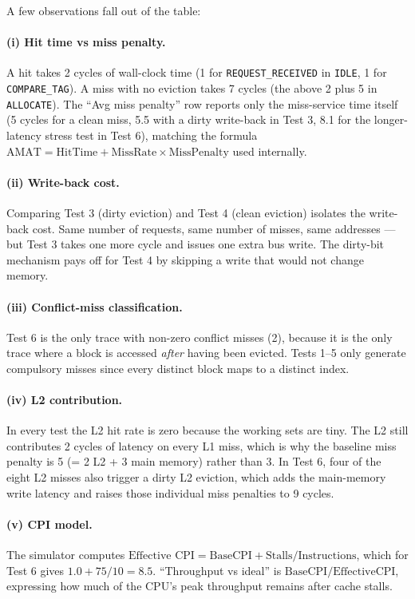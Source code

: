 \documentclass[11pt,a4paper]{article}
\begin{document}
A few observations fall out of the table:

\paragraph{(i) Hit time vs miss penalty.} A hit takes 2 cycles of wall-clock
time (1 for \texttt{REQUEST\_RECEIVED} in \texttt{IDLE}, 1 for
\texttt{COMPARE\_TAG}). A miss with no eviction takes 7 cycles (the above 2
plus 5 in \texttt{ALLOCATE}). The ``Avg miss penalty'' row reports only the
miss-service time itself (5 cycles for a clean miss, 5.5 with a dirty
write-back in Test 3, 8.1 for the longer-latency stress test in Test 6),
matching the formula
$\text{AMAT} = \text{HitTime} + \text{MissRate} \times \text{MissPenalty}$
used internally.

\paragraph{(ii) Write-back cost.} Comparing Test 3 (dirty eviction) and Test
4 (clean eviction) isolates the write-back cost. Same number of requests,
same number of misses, same addresses — but Test 3 takes one more cycle and
issues one extra bus write. The dirty-bit mechanism pays off for Test 4 by
skipping a write that would not change memory.

\paragraph{(iii) Conflict-miss classification.} Test 6 is the only trace with
non-zero conflict misses (2), because it is the only trace where a block is
accessed \emph{after} having been evicted. Tests 1–5 only generate
compulsory misses since every distinct block maps to a distinct index.

\paragraph{(iv) L2 contribution.} In every test the L2 hit rate is zero
because the working sets are tiny. The L2 still contributes 2 cycles of
latency on every L1 miss, which is why the baseline miss penalty is 5
(= 2 L2 + 3 main memory) rather than 3. In Test 6, four of the eight L2
misses also trigger a dirty L2 eviction, which adds the main-memory write
latency and raises those individual miss penalties to 9 cycles.

\paragraph{(v) CPI model.} The simulator computes
$\text{Effective CPI} = \text{BaseCPI} + \text{Stalls}/\text{Instructions}$,
which for Test 6 gives $1.0 + 75/10 = 8.5$. ``Throughput vs ideal'' is
$\text{BaseCPI}/\text{EffectiveCPI}$, expressing how much of the CPU's peak
throughput remains after cache stalls.
\end{document}
